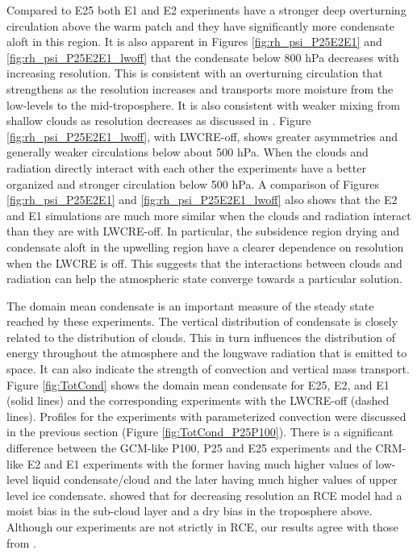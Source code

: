 \documentclass[draft]{agujournal2019}
\begin{document}
Compared to E25 both E1 and E2 experiments have a stronger deep overturning circulation above the warm 
patch and they have significantly more condensate aloft in this region.    It is also apparent in Figures 
\ref{fig:rh_psi_P25E2E1} and \ref{fig:rh_psi_P25E2E1_lwoff} that the condensate below 800 hPa 
decreases with increasing resolution.  
This is consistent with an overturning circulation that 
strengthens as the resolution increases and transports more moisture from the low-levels to the 
mid-troposphere.  It is also consistent with weaker mixing from shallow clouds as resolution decreases as
discussed in .   Figure \ref{fig:rh_psi_P25E2E1_lwoff}, with LWCRE-off, shows greater asymmetries 
and generally weaker circulations below about 500 hPa.  
When the clouds and radiation directly interact with each other the experiments have a better
organized and stronger circulation below 500 hPa.  A comparison of Figures \ref{fig:rh_psi_P25E2E1} and 
\ref{fig:rh_psi_P25E2E1_lwoff} also shows that the E2 and E1 simulations are much more 
similar when the clouds and radiation interact than they are with LWCRE-off.  In particular, the subsidence 
region drying and condensate aloft in the upwelling region have a clearer dependence on resolution when 
the LWCRE is off.  This suggests that the interactions between clouds and radiation can help the 
atmospheric state converge towards a particular solution.  

The domain mean condensate is an important measure of the steady state reached by these experiments.  The vertical 
distribution of condensate is closely related to the distribution of clouds.  This in turn influences the distribution of 
energy throughout the atmosphere and the longwave radiation that is emitted to space.  It can also indicate the 
strength of convection and vertical mass transport.     
Figure \ref{fig:TotCond} shows the domain mean condensate for E25, E2, and E1
(solid lines) and the corresponding experiments with the LWCRE-off (dashed lines).  Profiles for the experiments
with parameterized convection were discussed in the previous section (Figure \ref{fig:TotCond_P25P100}).  
There is a significant difference 
between the GCM-like P100, P25 and E25 experiments and the CRM-like E2 and E1 experiments with the former having much 
higher values of low-level liquid condensate/cloud and the later having much higher values of upper level ice 
condensate.   showed that for decreasing resolution an RCE model had a moist bias in the 
sub-cloud layer and a dry bias in the troposphere above.  Although our experiments are not strictly in RCE, our 
results agree with those from .   
\end{document}
